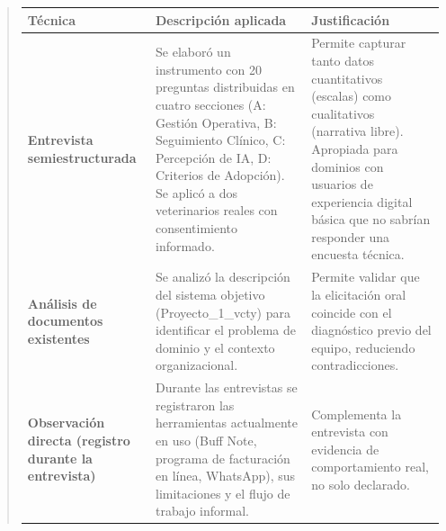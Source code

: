\documentclass[
]{article}
\newcounter{none} %
\begin{document}
\begin{quote}
{\def\LTcaptype{none} %
\begin{longtable}[]{|
  >{\raggedright\arraybackslash}p{}|
  >{\raggedright\arraybackslash}p{}|
  >{\raggedright\arraybackslash}p{}|}
\hline
\begin{minipage}[b]{\linewidth}\centering
\textbf{Técnica}
\end{minipage} & \begin{minipage}[b]{\linewidth}\raggedright
\textbf{Descripción aplicada}
\end{minipage} & \begin{minipage}[b]{\linewidth}\centering
\textbf{Justificación}
\end{minipage} \\
\hline
\endhead
\hline
\endlastfoot
\textbf{Entrevista semiestructurada} & Se elaboró un instrumento con 20
preguntas distribuidas en cuatro secciones (A: Gestión Operativa, B:
Seguimiento Clínico, C: Percepción de IA, D: Criterios de Adopción). Se
aplicó a dos veterinarios reales con consentimiento informado. &
\begin{minipage}[t]{\linewidth}\raggedright
Permite capturar tanto datos cuantitativos (escalas) como cualitativos
(narrativa libre). Apropiada para dominios con usuarios de experiencia
digital básica que no sabrían responder una encuesta técnica.
\end{minipage} \\
\hline
\textbf{Análisis de documentos existentes} & Se analizó la descripción
del sistema objetivo (Proyecto\_1\_vcty) para identificar el problema de
dominio y el contexto organizacional. & \begin{minipage}[t]{\linewidth}\raggedright
Permite validar que la elicitación oral coincide con el diagnóstico
previo del equipo, reduciendo contradicciones.
\end{minipage} \\
\hline
\textbf{Observación directa (registro durante la entrevista)} & Durante
las entrevistas se registraron las herramientas actualmente en uso (Buff
Note, programa de facturación en línea, WhatsApp), sus limitaciones y el flujo de trabajo informal. &
\begin{minipage}[t]{\linewidth}\raggedright
Complementa la entrevista con evidencia de comportamiento real, no solo
declarado.
\end{minipage} \\
\hline
\end{longtable}
}


\end{quote}
\end{document}
